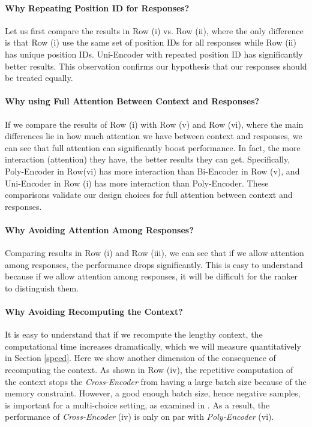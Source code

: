\paragraph{Why Repeating Position ID for Responses?}
Let us first compare the results in Row (i) vs. Row (ii), where the only difference is that Row (i) use the same set of position IDs for all responses while Row (ii) has unique position IDs. Uni-Encoder with repeated position ID has significantly better results. This observation confirms our hypothesis that our responses should be treated equally.  


\paragraph{Why using Full Attention Between Context and Responses?} If we compare the results of Row (i) with Row (v) and Row (vi), where the main differences lie in how much attention we have between context and responses, we can see that full attention can significantly boost performance. In fact, the more interaction (attention) they have, the better results they can get. Specifically, Poly-Encoder in Row(vi) has more interaction than Bi-Encoder in Row (v), and Uni-Encoder in Row (i) has more interaction than Poly-Encoder. These comparisons validate our design choices for full attention between context and responses. 


\paragraph{Why Avoiding Attention Among Responses?}

Comparing results in Row (i) and Row (iii), we can see that if we allow attention among responses, the performance drops significantly. This is easy to understand because if we allow attention among responses, it will be difficult for the ranker to distinguish them. 

\paragraph{Why Avoiding Recomputing the Context?}
It is easy to understand that if we recompute the lengthy context, the computational time increases dramatically, which we will measure quantitatively in Section \ref{speed}. Here we show another dimension of the consequence of recomputing the context. As shown in Row (iv), the repetitive computation of the context stops the \textit{Cross-Encoder} from having a large batch size because of the memory constraint. However, a good enough batch size, hence negative samples, is important for a multi-choice setting, as examined in \citet{humeau2019poly}. As a result, the performance of \textit{Cross-Encoder} (iv) is only on par with \textit{Poly-Encoder} (vi).



